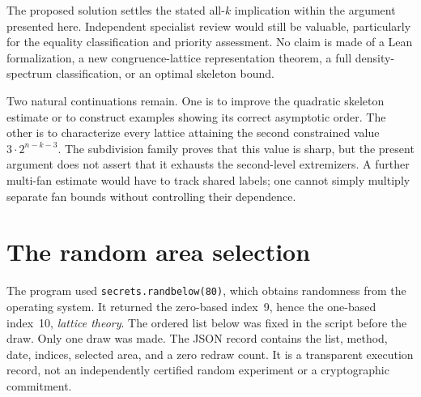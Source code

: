 \documentclass[11pt,a4paper]{article}
\numberwithin{equation}{section}
\theoremstyle{definition}
\theoremstyle{remark}
\begin{document}
The proposed solution settles the stated all-$k$ implication within the argument
presented here. Independent specialist review would still be valuable,
particularly for the equality classification and priority assessment.
No claim is made of a Lean formalization, a new congruence-lattice representation
theorem, a full density-spectrum classification, or an optimal skeleton bound.

Two natural continuations remain. One is to improve the quadratic skeleton
estimate or to construct examples showing its correct asymptotic order.
The other is to characterize every lattice attaining the second constrained
value $3\cdot2^{n-k-3}$. The subdivision family proves that this value is sharp,
but the present argument does not assert that it exhausts the second-level
extremizers. A further multi-fan estimate would have to track shared labels;
one cannot simply multiply separate fan bounds without controlling their
dependence.

\appendix
\clearpage
\section{The random area selection}\label{app:selection}
The program used \texttt{secrets.randbelow(80)}, which obtains randomness from
the operating system. It returned the zero-based index~9, hence the one-based
index~10, \emph{lattice theory}. The ordered list below was fixed in the script
before the draw. Only one draw was made. The JSON record contains the list,
method, date, indices, selected area, and a zero redraw count.
It is a transparent execution record, not an independently certified random
experiment or a cryptographic commitment.
\end{document}
